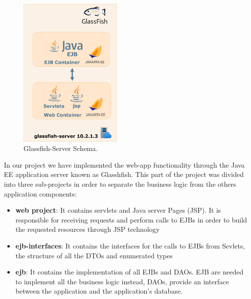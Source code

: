 \begin{figure}[H]
    \centering
     \includegraphics[width=0.45\textwidth]{img/system_architecture/glassfish-server.png}
    \caption{\label{fig:glassfish-server} Glassfish-Server Schema.}
\end{figure}

In our project we have implemented the web-app functionality through the Java EE application server known as Glasshfish. This part of the project was divided into three sub-projects in order to separate the business logic from the others application components:
\begin{itemize}
    \item \textbf{web project}: It contains servlets and Java server Pages (JSP). It is responsible for receiving requests and perform calls to EJBs in order to build the requested resources through JSP technology
    \item \textbf{ejb-interfaces}: It contains the interfaces for the calls to EJBs from Sevlets, the structure of all the DTOs and enumerated types
    \item \textbf{ejb}: It contains the implementation of all EJBs and DAOs. EJB are needed to implement all the business logic instead, DAOs, provide an interface between the application and the application's database.
\end{itemize}